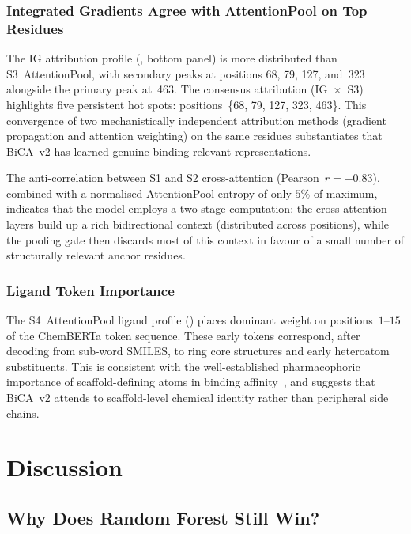 \documentclass[11pt,twocolumn]{article}
\begin{document}
\subsubsection{Integrated Gradients Agree with AttentionPool on Top Residues}

The IG attribution profile (, bottom panel) is
more distributed than S3~AttentionPool, with secondary peaks at positions
68, 79, 127, and~323 alongside the primary peak at~463.  The consensus
attribution (IG~$\times$~S3) highlights five persistent hot spots:
positions~\{68, 79, 127, 323, 463\}.  This convergence of two mechanistically
independent attribution methods (gradient propagation and attention weighting)
on the same residues substantiates that BiCA~v2 has learned genuine
binding-relevant representations.

The anti-correlation between S1 and S2 cross-attention (Pearson~$r=-0.83$),
combined with a normalised AttentionPool entropy of only $5\%$ of maximum,
indicates that the model employs a two-stage computation: the cross-attention
layers build up a rich bidirectional context (distributed across positions),
while the pooling gate then discards most of this context in favour of a
small number of structurally relevant anchor residues.

\subsubsection{Ligand Token Importance}

The S4~AttentionPool ligand profile () places
dominant weight on positions~$1$--$15$ of the ChemBERTa token sequence.
These early tokens correspond, after decoding from sub-word SMILES, to ring
core structures and early heteroatom substituents.  This is consistent with
the well-established pharmacophoric importance of scaffold-defining atoms
in binding affinity~\cite{volkov2022frustration}, and suggests that BiCA~v2
attends to scaffold-level chemical identity rather than peripheral side chains.

\section{Discussion}

\subsection{Why Does Random Forest Still Win?}
\end{document}
